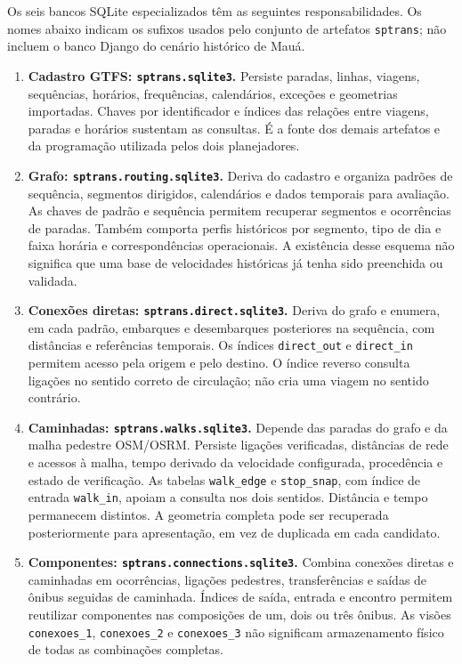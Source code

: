Os seis bancos SQLite especializados têm as seguintes responsabilidades. Os nomes abaixo indicam os sufixos usados pelo conjunto de artefatos \texttt{sptrans}; não incluem o banco Django do cenário histórico de Mauá.
\begin{enumerate}
\item \textbf{Cadastro GTFS: \nolinkurl{sptrans.sqlite3}.} Persiste paradas, linhas, viagens, sequências, horários, frequências, calendários, exceções e geometrias importadas. Chaves por identificador e índices das relações entre viagens, paradas e horários sustentam as consultas. É a fonte dos demais artefatos e da programação utilizada pelos dois planejadores.
\item \textbf{Grafo: \nolinkurl{sptrans.routing.sqlite3}.} Deriva do cadastro e organiza padrões de sequência, segmentos dirigidos, calendários e dados temporais para avaliação. As chaves de padrão e sequência permitem recuperar segmentos e ocorrências de paradas. Também comporta perfis históricos por segmento, tipo de dia e faixa horária e correspondências operacionais. A existência desse esquema não significa que uma base de velocidades históricas já tenha sido preenchida ou validada.
\item \textbf{Conexões diretas: \nolinkurl{sptrans.direct.sqlite3}.} Deriva do grafo e enumera, em cada padrão, embarques e desembarques posteriores na sequência, com distâncias e referências temporais. Os índices \nolinkurl{direct_out} e \nolinkurl{direct_in} permitem acesso pela origem e pelo destino. O índice reverso consulta ligações no sentido correto de circulação; não cria uma viagem no sentido contrário.
\item \textbf{Caminhadas: \nolinkurl{sptrans.walks.sqlite3}.} Depende das paradas do grafo e da malha pedestre OSM/OSRM. Persiste ligações verificadas, distâncias de rede e acessos à malha, tempo derivado da velocidade configurada, procedência e estado de verificação. As tabelas \nolinkurl{walk_edge} e \nolinkurl{stop_snap}, com índice de entrada \nolinkurl{walk_in}, apoiam a consulta nos dois sentidos. Distância e tempo permanecem distintos. A geometria completa pode ser recuperada posteriormente para apresentação, em vez de duplicada em cada candidato.
\item \textbf{Componentes: \nolinkurl{sptrans.connections.sqlite3}.} Combina conexões diretas e caminhadas em ocorrências, ligações pedestres, transferências e saídas de ônibus seguidas de caminhada. Índices de saída, entrada e encontro permitem reutilizar componentes nas composições de um, dois ou três ônibus. As visões \nolinkurl{conexoes_1}, \nolinkurl{conexoes_2} e \nolinkurl{conexoes_3} não significam armazenamento físico de todas as combinações completas.

\end{enumerate}
